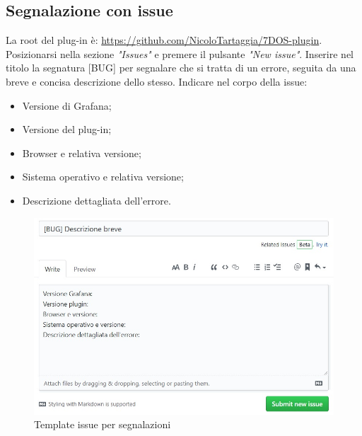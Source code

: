 \subsection{Segnalazione con issue}
La root del plug-in è: \url{https://github.com/NicoloTartaggia/7DOS-plugin}. \\
Posizionarsi nella sezione \emph{"Issues"} e premere il pulsante \emph{"New issue"}. Inserire nel titolo la segnatura [BUG] per segnalare che si tratta di un errore, seguita da una breve e concisa descrizione dello stesso.
Indicare nel corpo della issue:
\begin{itemize}
	\item Versione di Grafana;
	\item Versione del plug-in;
	\item Browser e relativa versione;
	\item Sistema operativo e relativa versione;
	\item Descrizione dettagliata dell'errore.
\end{itemize}
\begin{figure} [H]
	\centering
	\includegraphics[scale=0.9]{Img/issue.jpg} 
	\caption{Template issue per segnalazioni} \label{} 
\end{figure} 

\newpage